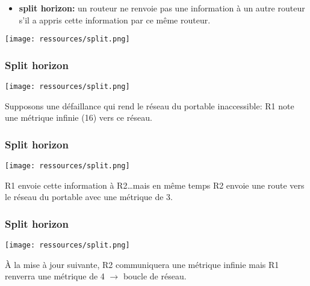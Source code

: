 \documentclass[svgnames,11pt]{beamer}
\begin{document}
\begin{frame}
    \frametitle{}

    \begin{itemize}
        \item\textbf{split horizon:} un routeur ne renvoie pas une information à un autre routeur s’il a appris cette information par ce même routeur.
    \end{itemize}
\begin{center}
\centering
\texttt{[image: ressources/split.png]}
\label{IMG}
\end{center}
\end{frame}

\begin{frame}
    \frametitle{Split horizon}

    \begin{center}
        \centering
        \texttt{[image: ressources/split.png]}
        \label{IMG}
        \end{center}
Supposons une défaillance qui rend le réseau du portable inaccessible: R1 note une métrique infinie (16) vers ce réseau.
\end{frame}
\begin{frame}
    \frametitle{Split horizon}

    \begin{center}
        \centering
        \texttt{[image: ressources/split.png]}
        \label{IMG}
        \end{center}
R1 envoie cette information à R2\dots mais en même temps R2 envoie une route vers le réseau du portable avec une métrique de 3.
\end{frame}

\begin{frame}
    \frametitle{Split horizon}

    \begin{center}
        \centering
        \texttt{[image: ressources/split.png]}
        \label{IMG}
        \end{center}
À la mise à jour suivante, R2 communiquera une métrique infinie mais R1 renverra une métrique de 4 $\rightarrow$ boucle de réseau.
\end{frame}
\end{document}
